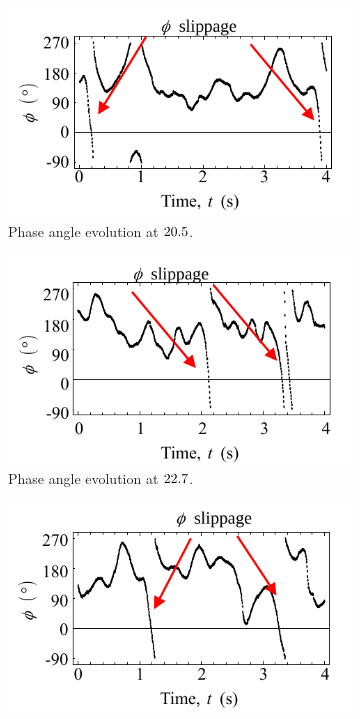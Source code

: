 \documentclass[oneside]{utmthesis}
\begin{document}
\begin{figure}[H]
  \centering
  \begin{subfigure}[b]{0.48\textwidth}
    \includegraphics[width=1\textwidth]{figs/phaseAngle-a}
    \caption{Phase angle evolution at $20.5$.}
    \label{fig:phaseAngle-a}
  \end{subfigure}
  \hfill
  \begin{subfigure}[b]{0.48\textwidth}
    \includegraphics[width=1\textwidth]{figs/phaseAngle-b}
    \caption{Phase angle evolution at $22.7$.}
    \label{fig:phaseAngle-b}
  \end{subfigure}
  \hfill
  \begin{subfigure}[b]{0.48\textwidth}
    \includegraphics[width=1\textwidth]{figs/phaseAngle-c}

\end{subfigure}
\end{figure}
\end{document}
